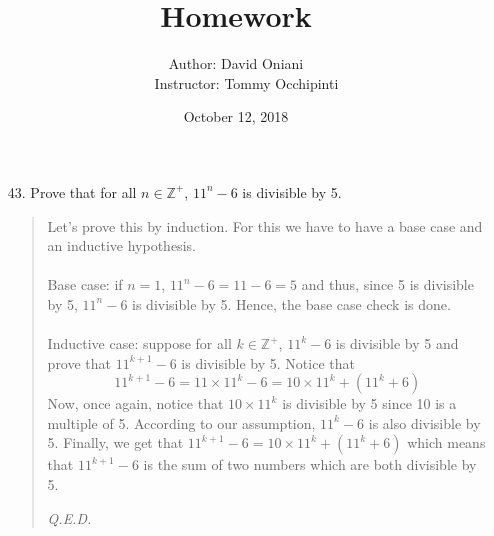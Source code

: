 \documentclass[12pt, a4paper]{article}                      %
\title{\bf{Homework \textnumero 6}}
\author{Author: David Oniani
\\
\ \ \ Instructor: Tommy Occhipinti}
\date{October 12, 2018}
\newcommand{\intzp}{\mathbb{Z^+}}
\begin{document}
\maketitle


\begin{itemize}
\item[43.]
Prove that for all $n \in \intzp$, $11^n - 6$ is divisible by 5.
\begin{quote}
Let's prove this by induction. For this we have to have a base case
and an inductive hypothesis.\\\\
Base case: if $n = 1$, $11^n - 6 = 11 - 6 = 5$ and thus, since 5 is divisible by 5, $11^n - 6$ is divisible by 5. Hence, the base case check is done.\\\\
Inductive case: suppose for all $k \in \intzp$, $11^k - 6$ is divisible by 5 and prove that $11^{k + 1} - 6$ is divisible by 5.
Notice that
$$11^{k + 1} - 6 = 11 \times 11^k - 6 = 10 \times 11^k + (11^k + 6)$$
Now, once again, notice that $10 \times 11^k$ is divisible by 5 since 10 is a multiple of 5. According to our assumption,
$11^k - 6$ is also divisible by 5.
Finally, we get that $11^{k + 1} - 6 = 10\times 11^k + (11^k + 6)$ which means that $11^{k + 1} - 6$ is the sum of two numbers which
are both divisible by 5.
\begin{flushright}
\textit{Q.E.D.}
\end{flushright}
\end{quote}

\item[]


\end{itemize}
\end{document}
